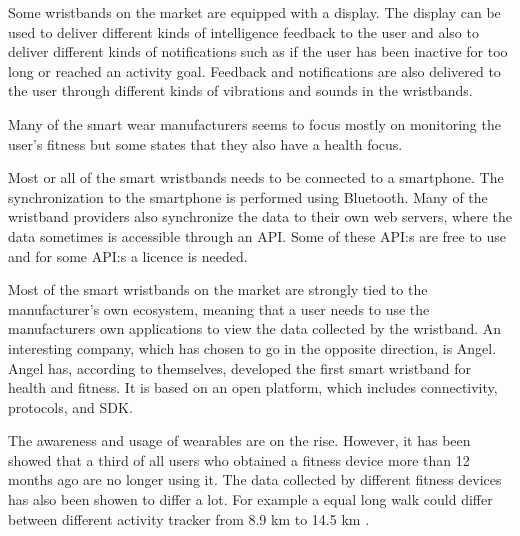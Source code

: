 \documentclass{cslthse-msc}
\begin{document}
Some wristbands on the market are equipped with a display. The display can be used to deliver different kinds of intelligence feedback to the user and also to deliver different kinds of notifications such as if the user has been inactive for too long or reached an activity goal.  Feedback and notifications are also delivered to the user through different kinds of vibrations and sounds in the wristbands. 

Many of the smart wear manufacturers seems to focus mostly on monitoring the user’s fitness but some states that they also have a health focus.

Most or all of the smart wristbands needs to be connected to a smartphone. The synchronization to the smartphone is performed using Bluetooth. Many of the wristband providers also synchronize the data to their own web servers, where the data sometimes is accessible through an API. Some of these API:s are free to use and for some API:s a licence is needed.%

Most of the smart wristbands on the market are strongly tied to the manufacturer’s own ecosystem, meaning that a user needs to use the manufacturers own applications to view the data collected by the wristband. An interesting company, which has chosen to go in the opposite direction, is Angel. Angel has, according to themselves\cite{angelfaq}, developed the first smart wristband for health and fitness. It is based on an open platform, which includes connectivity, protocols, and SDK. 

The awareness and usage of wearables are on the rise. However, it has been showed that a third of all users who obtained a fitness device more than 12 months ago are no longer using it. The data collected by different fitness devices has also been showen to differ a lot. For example a equal long walk could differ between different activity tracker from 8.9 km to 14.5 km \cite{wearable-technology-cannot-be-trusted}.

\end{document}
